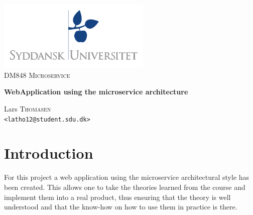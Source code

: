 \documentclass[a4paper,11pt,oneside]{book}
\title{}
\author{}
\date{}
\begin{document}
\begin{titlepage}
\begin{center}

\thispagestyle{empty}
\includegraphics[width=0.55\textwidth]{logo.pdf}\\[1cm]    
\textsc{\Large DM848 Microservice}\\[0.5cm]

\begin{Huge}
\textbf{WebApplication using the microservice architecture}
\end{Huge}

\vspace{1cm}

\begin{minipage}{1\textwidth}
\begin{center}


Lars \textsc{Thomasen}\\
\verb!<latho12@student.sdu.dk>!\\

\end{center}
\end{minipage}


\renewcommand{\contentsname}{Table of Contents}
\tableofcontents
\end{center}
\end{titlepage}


\pagestyle{ruled}

%
%

\chapter{Introduction}
\setcounter{section}{1}

For this project a web application using the microservice architectural style has been created. This allows one to take the theories learned from the course and implement them into a real product, thus ensuring that the theory is well understood and that the know-how on how to use them in practice is there.
\end{document}
